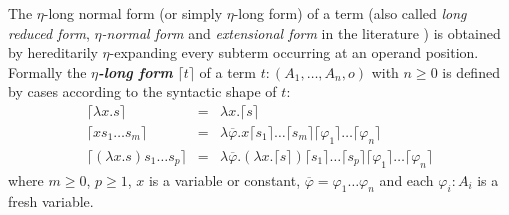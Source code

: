 \documentclass{llncs}
\newcommand\defname[1]{{\bf\em #1}\index{#1}}
\newcommand{\elnf}[1]{\lceil #1\rceil} %
\begin{document}
The $\eta$-long normal form (or simply $\eta$-long form) of a term
(also called \emph{long reduced form}, \emph{$\eta$-normal form} and
\emph{extensional form} in the literature
\cite{DBLP:journals/tcs/JensenP76,DBLP:journals/tcs/Huet75,huet76}) is
obtained by hereditarily $\eta$-expanding every subterm occurring at
an operand position. Formally the \defname{$\eta$-long form}
$\elnf{t}$ of a term $t: (A_1,\ldots,A_n,o)$ with $n \geq 0$ is
defined by cases according to the syntactic shape of $t$:
\begin{eqnarray*}
  \elnf{\lambda x . s } &=& \lambda x . \elnf{s} \\
  \elnf{x s_1 \ldots s_m } &=& \lambda \overline{\varphi} . x \elnf{s_1}\ldots \elnf{s_m} \elnf{\varphi_1} \ldots \elnf{\varphi_n} \\
  \elnf{(\lambda x . s) s_1 \ldots s_p } &=& \lambda \overline{\varphi} . (\lambda x . \elnf{s}) \elnf{s_1} \ldots \elnf{s_p} \elnf{\varphi_1} \ldots \elnf{\varphi_n}
\end{eqnarray*}
where $m \geq 0$, $p\geq 1$, $x$ is a  variable or constant, $\overline{\varphi} = \varphi_1 \ldots \varphi_n$ and each $\varphi_i : A_i$ is a fresh variable.

\end{document}
